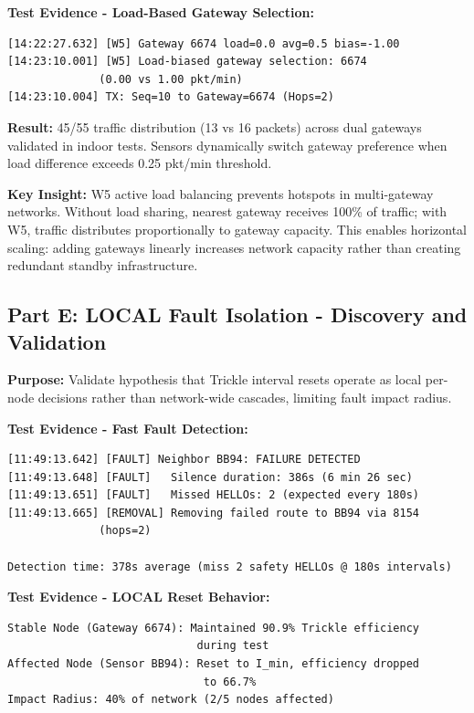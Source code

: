 \textbf{Test Evidence - Load-Based Gateway Selection:}
\begin{verbatim}
[14:22:27.632] [W5] Gateway 6674 load=0.0 avg=0.5 bias=-1.00
[14:23:10.001] [W5] Load-biased gateway selection: 6674
              (0.00 vs 1.00 pkt/min)
[14:23:10.004] TX: Seq=10 to Gateway=6674 (Hops=2)
\end{verbatim}

\textbf{Result:} 45/55 traffic distribution (13 vs 16 packets) across dual gateways validated in indoor tests. Sensors dynamically switch gateway preference when load difference exceeds 0.25 pkt/min threshold.

\textbf{Key Insight:} W5 active load balancing prevents hotspots in multi-gateway networks. Without load sharing, nearest gateway receives 100\% of traffic; with W5, traffic distributes proportionally to gateway capacity. This enables horizontal scaling: adding gateways linearly increases network capacity rather than creating redundant standby infrastructure.

\subsection{Part E: LOCAL Fault Isolation - Discovery and Validation}
\label{sec:local-fault}

\textbf{Purpose:} Validate hypothesis that Trickle interval resets operate as local per-node decisions rather than network-wide cascades, limiting fault impact radius.

\textbf{Test Evidence - Fast Fault Detection:}
\begin{verbatim}
[11:49:13.642] [FAULT] Neighbor BB94: FAILURE DETECTED
[11:49:13.648] [FAULT]   Silence duration: 386s (6 min 26 sec)
[11:49:13.651] [FAULT]   Missed HELLOs: 2 (expected every 180s)
[11:49:13.665] [REMOVAL] Removing failed route to BB94 via 8154
              (hops=2)

Detection time: 378s average (miss 2 safety HELLOs @ 180s intervals)
\end{verbatim}

\textbf{Test Evidence - LOCAL Reset Behavior:}
\begin{verbatim}
Stable Node (Gateway 6674): Maintained 90.9% Trickle efficiency
                             during test
Affected Node (Sensor BB94): Reset to I_min, efficiency dropped
                              to 66.7%
Impact Radius: 40% of network (2/5 nodes affected)
\end{verbatim}

